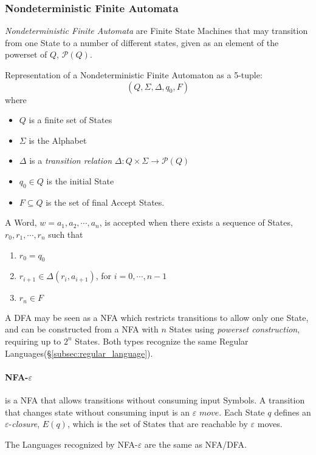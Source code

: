 \documentclass{article}
\begin{document}
\subsubsection{Nondeterministic Finite Automata}\label{subsec:ndfa}
\emph{Nondeterministic Finite Automata} are Finite State Machines that
may transition from one State to a number of different states, given
as an element of the powerset of $Q$, $\mathcal{P}(Q)$.

Representation of a Nondeterministic Finite Automaton as a
5-tuple:
\[
    (Q,\Sigma,\Delta,q_0,F)
\]
where
\begin{itemize}
\item $Q$ is a finite set of States
\item $\Sigma$ is the Alphabet
\item $\Delta$ is a \emph{transition relation} $\Delta: Q \times
  \Sigma \rightarrow \mathcal{P}(Q)$
\item $q_0 \in Q$ is the initial State
\item $F \subseteq Q$ is the set of final Accept States.
\end{itemize}

A Word, $w=a_1,a_2,\cdots,a_n$, is accepted when there exists a
sequence of States, $r_0,r_1,\cdots,r_n$ such that
\begin{enumerate}
\item $r_0 = q_0$
\item $r_{i+1} \in \Delta(r_i, a_{i+1})$, for $i = 0, \cdots, n-1$
\item $r_n \in F$
\end{enumerate}

A DFA may be seen as a NFA which restricts transitions to allow only
one State, and can be constructed from a NFA with $n$ States using
\emph{powerset construction}, requiring up to $2^n$ States. Both types
recognize the same Regular Languages(\S\ref{subsec:regular_language}).

\paragraph{NFA-$\varepsilon$} is a NFA that allows transitions
without consuming input Symbols. A transition that changes state
without consuming input is an $\varepsilon$ $move$. Each State $q$
defines an $\varepsilon$-\emph{closure}, $E(q)$, which is the set of
States that are reachable by $\varepsilon$ moves.

The Languages recognized by NFA-$\varepsilon$ are the same as NFA/DFA.
\end{document}
